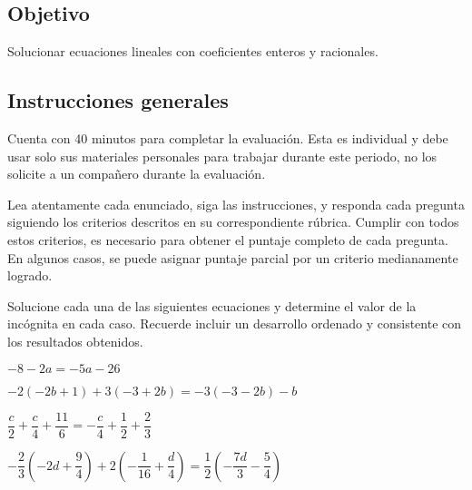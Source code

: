 \documentclass[]{srs2}
\begin{document}
\subsection*{Objetivo}
  Solucionar ecuaciones lineales con coeficientes enteros y racionales.

\subsection*{Instrucciones generales}
  Cuenta con 40 minutos para completar la evaluación. Esta es individual y debe usar solo
  sus materiales personales para trabajar durante este periodo, no los solicite a un compañero
  durante la evaluación.

  Lea atentamente cada enunciado, siga las instrucciones, y responda cada
  pregunta siguiendo los criterios descritos en su correspondiente rúbrica. Cumplir
  con todos estos criterios, es necesario para obtener el puntaje completo de cada pregunta.
  En algunos casos, se puede asignar puntaje parcial por un criterio medianamente logrado.

\separador[2mm]

  Solucione cada una de las siguientes ecuaciones y determine el valor de la incógnita
  en cada caso. Recuerde incluir un desarrollo ordenado y consistente con los resultados
  obtenidos.

\begin{preguntas}
  \pregunta $-8-2a=-5a-26$
  \begin{malla}[7]
  \end{malla}
  \usebox{\rubricaUno}

  \pregunta $-2\left(-2b+1\right)+3\left(-3+2b\right)=-3\left(-3-2b\right)-b$
  \begin{malla}[7]
  \end{malla}
  \usebox{\rubricaUno}

  \pregunta $\dfrac{c}{2}+ \dfrac{c}{4} + \dfrac{11}{6}= -\dfrac{c}{4} + \dfrac{1}{2} + \dfrac{2}{3}$
  \begin{malla}[8]
  \end{malla}
  \usebox{\rubricaUno}

  \pregunta $-\dfrac{2}{3}\left(-2d+\dfrac{9}{4}\right) + 2\left(-\dfrac{1}{16}+\dfrac{d}{4}\right)= \dfrac{1}{2}\left(-\dfrac{7d}{3}-\dfrac{5}{4}\right)$
  \begin{malla}[12]
  \end{malla}
  \usebox{\rubricaUno}

\end{preguntas}
\end{document}
